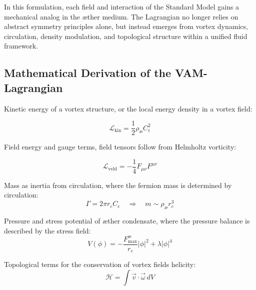 In this formulation, each field and interaction of the Standard Model gains a mechanical analog in the æther medium. The Lagrangian no longer relies on abstract symmetry principles alone, but instead emerges from vortex dynamics, circulation, density modulation, and topological structure within a unified fluid framework.


\subsection*{Mathematical Derivation of the VAM-Lagrangian}

Kinetic energy of a vortex structure, or the local energy density in a vortex field:

\[
    \mathcal{L}_\text{kin} = \frac{1}{2}\rho_\text{\ae} C_e^2
\]

Field energy and gauge terms, field tensors follow from Helmholtz vorticity:

\[
    \mathcal{L}_\text{veld} = -\frac{1}{4}F_{\mu\nu}F^{\mu\nu}
\]

Mass as inertia from circulation, where the fermion mass is determined by circulation:
\[
    \Gamma = 2\pi r_c C_e \quad\Rightarrow\quad m \sim \rho_\text{\ae} r_c^3
\]

Pressure and stress potential of æther condensate, where the pressure balance is described by the stress field:
\[
    V(\phi) = -\frac{F^{\text{\ae}}_{\text{max}}}{r_c}|\phi|^2 + \lambda|\phi|^4
\]

Topological terms for the conservation of vortex fields helicity:
\[
    \mathcal{H} = \int \vec{v}\cdot\vec{\omega}\, dV
\]


